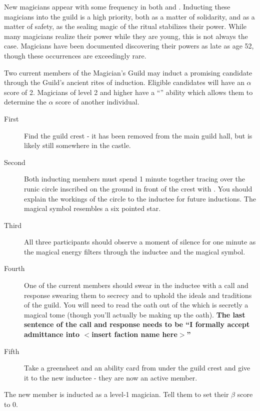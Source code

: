 \documentclass[green]{NeptuneBall}
\begin{document}
\name{\gInduction{}}

New magicians appear with some frequency in both \pPacifica{} and \pAtlantis{}. Inducting these magicians into the guild is a high priority, both as a matter of solidarity, and as a matter of safety, as the sealing magic of the ritual stabilizes their power. While many magicians realize their power while they are young, this is not always the case. Magicians have been documented discovering their powers as late as age 52, though these occurrences are exceedingly rare.

Two current members of the Magician's Guild may induct a promising candidate through the Guild's ancient rites of induction. Eligible candidates will have an $\alpha$ score of 2. Magicians of level 2 and higher have a ``\aPerceive{}'' ability which allows them to determine the $\alpha$ score of another individual.
\begin{description}
\item[First] Find the guild crest - it has been removed from the main guild hall, but is likely still somewhere in the castle. 
\item[Second] Both inducting members must spend 1 minute together tracing over the runic circle inscribed on the ground in front of the crest with \iChalk{}. You should explain the workings of the circle to the inductee for future inductions. The magical symbol resembles a six pointed star. 
\item[Third] All three participants should observe a moment of silence for one minute as the magical energy filters through the inductee and the magical symbol. 
\item[Fourth] One of the current members should swear in the inductee with a call and response swearing them to secrecy and to uphold the ideals and traditions of the guild. You will need to read the oath out of the \iBook{} which is secretly a magical tome (though you'll actually be making up the oath). {\bf The last sentence of the call and response needs to be ``I formally accept admittance into $<$insert faction name here$>$''}
\item[Fifth] Take a greensheet and an ability card from under the guild crest and give it to the new inductee - they are now an active member.
\end{description}

The new member is inducted as a level-1 magician. Tell them to set their $\beta$ score to 0.
\end{document}
